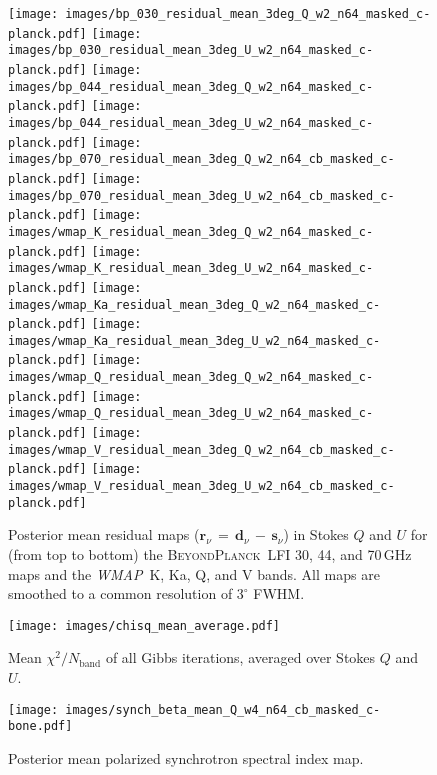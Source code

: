 \documentclass[twocolumn]{aa}
\def\WMAP{\textit{WMAP}}
\newcommand{\BP}{\textsc{BeyondPlanck}}
\begin{document}
\begin{figure}[t]
\centering
\texttt{[image: images/bp\_030\_residual\_mean\_3deg\_Q\_w2\_n64\_masked\_c-planck.pdf]}
\texttt{[image: images/bp\_030\_residual\_mean\_3deg\_U\_w2\_n64\_masked\_c-planck.pdf]}
\texttt{[image: images/bp\_044\_residual\_mean\_3deg\_Q\_w2\_n64\_masked\_c-planck.pdf]}
\texttt{[image: images/bp\_044\_residual\_mean\_3deg\_U\_w2\_n64\_masked\_c-planck.pdf]}
\texttt{[image: images/bp\_070\_residual\_mean\_3deg\_Q\_w2\_n64\_cb\_masked\_c-planck.pdf]}
\texttt{[image: images/bp\_070\_residual\_mean\_3deg\_U\_w2\_n64\_cb\_masked\_c-planck.pdf]}
\texttt{[image: images/wmap\_K\_residual\_mean\_3deg\_Q\_w2\_n64\_masked\_c-planck.pdf]}
\texttt{[image: images/wmap\_K\_residual\_mean\_3deg\_U\_w2\_n64\_masked\_c-planck.pdf]}
\texttt{[image: images/wmap\_Ka\_residual\_mean\_3deg\_Q\_w2\_n64\_masked\_c-planck.pdf]}
\texttt{[image: images/wmap\_Ka\_residual\_mean\_3deg\_U\_w2\_n64\_masked\_c-planck.pdf]}
\texttt{[image: images/wmap\_Q\_residual\_mean\_3deg\_Q\_w2\_n64\_masked\_c-planck.pdf]}
\texttt{[image: images/wmap\_Q\_residual\_mean\_3deg\_U\_w2\_n64\_masked\_c-planck.pdf]}
\texttt{[image: images/wmap\_V\_residual\_mean\_3deg\_Q\_w2\_n64\_cb\_masked\_c-planck.pdf]}
\texttt{[image: images/wmap\_V\_residual\_mean\_3deg\_U\_w2\_n64\_cb\_masked\_c-planck.pdf]}
\caption{Posterior mean residual maps
  ($\boldsymbol{r}_{\nu}\,=\,\boldsymbol{d}_{\nu}\,-\,\boldsymbol{s}_{\nu}$)
  in Stokes $Q$ and $U$ for (from top to bottom) the \BP\ LFI 30, 44,
  and 70\,GHz maps and the \WMAP\ K, Ka, Q, and V bands. All maps are
  smoothed to a common resolution of $3^\circ$ FWHM.}
\label{fig:res}
\end{figure}

\begin{figure}[t]
\centering
\texttt{[image: images/chisq\_mean\_average.pdf]}
\caption{Mean $\chi^2/N_{\mathrm{band}}$ of all Gibbs iterations, averaged over Stokes $Q$ and $U$.}
\label{fig:chisq}
\end{figure}

\begin{figure}[t]
\centering
\texttt{[image: images/synch\_beta\_mean\_Q\_w4\_n64\_cb\_masked\_c-bone.pdf]}
\caption{Posterior mean polarized synchrotron spectral index map.}
\label{fig:synch_beta}
\end{figure}
\end{document}
